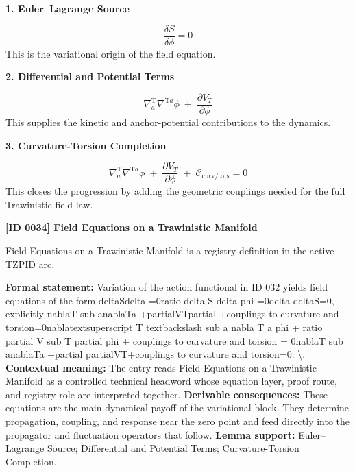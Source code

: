 \noindent\textbf{1. Euler--Lagrange Source}\par
\[
\frac{\delta S}{\delta \phi}=0
\]
\noindent This is the variational origin of the field equation.\par
\noindent\textbf{2. Differential and Potential Terms}\par
\[
\nabla^{\mathrm{T}}_{a}\nabla^{\mathrm{T}a}\phi
\;+\;
\frac{\partial V_{T}}{\partial \phi}
\]
\noindent This supplies the kinetic and anchor-potential contributions to the dynamics.\par
\noindent\textbf{3. Curvature-Torsion Completion}\par
\[
\nabla^{\mathrm{T}}_{a}\nabla^{\mathrm{T}a}\phi
\;+\;
\frac{\partial V_{T}}{\partial \phi}
\;+\;
\mathcal{C}_{\mathrm{curv/tors}}
=0
\]
\noindent This closes the progression by adding the geometric couplings needed for the full Trawinistic field law.\par

\clearpage
\noindent\textbf{[ID 0034] Field Equations on a Trawinistic Manifold}\par
\vspace{0.35em}
\begingroup\small
{}
Field Equations on a Trawinistic Manifold is a registry definition in the active TZPID arc.

\begingroup\footnotesize\setlength{\emergencystretch}{3em}\sloppy
\textbf{Formal statement:} Variation of the action functional in ID 032 yields field equations of the form deltaSdelta =0ratio delta S delta phi =0delta deltaS=0, explicitly nablaT sub anablaTa +partialVTpartial +couplings to curvature and torsion=0nablatextsuperscript T textbackslash sub a nabla T a phi + ratio partial V sub T partial phi + couplings to curvature and torsion = 0nablaT sub anablaTa +partial partialVT+couplings to curvature and torsion=0. \textbackslash{}. \textbf{Contextual meaning:} The entry reads Field Equations on a Trawinistic Manifold as a controlled technical headword whose equation layer, proof route, and registry role are interpreted together. \textbf{Derivable consequences:} These equations are the main dynamical payoff of the variational block. They determine propagation, coupling, and response near the zero point and feed directly into the propagator and fluctuation operators that follow. \textbf{Lemma support:} Euler--Lagrange Source; Differential and Potential Terms; Curvature-Torsion Completion.\par
\endgroup

